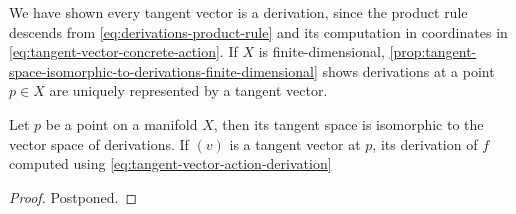 \documentclass[../main-manifolds.tex]{subfiles}
\begin{document}
%
%
We have shown every tangent vector is a derivation, since the product rule descends from \cref{eq:derivations-product-rule} and its computation in coordinates in \cref{eq:tangent-vector-concrete-action}.  If $X$ is finite-dimensional, \cref{prop:tangent-space-isomorphic-to-derivations-finite-dimensional} shows derivations at a point $p\in X$ are uniquely represented by a tangent vector.
%
%
\begin{wts}\label{prop:tangent-space-isomorphic-to-derivations-finite-dimensional}
Let $p$ be a point on a manifold $X$, then its tangent space is isomorphic to the vector space of derivations. If $(v)$ is a tangent vector at $p$, its derivation of $f$ computed using \cref{eq:tangent-vector-action-derivation} 
\end{wts}
\begin{proof}
    Postponed.
\end{proof}
\end{document}
